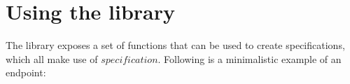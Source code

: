 





\section{Using the library}

The library exposes a set of functions that can be used to create
specifications, which all make use of $specification$. Following is a
minimalistic example of an endpoint:\\

